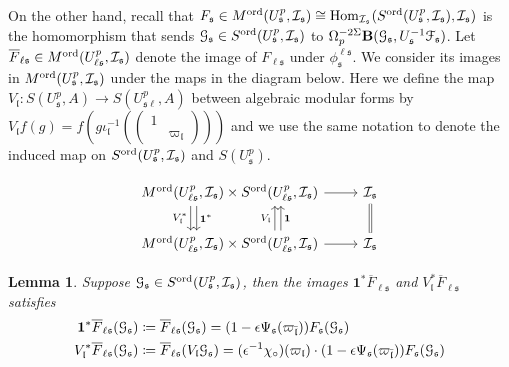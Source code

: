 \documentclass[leqno]{amsart}
\newtheorem{lem}[thm]{Lemma}
\theoremstyle{definition}
\theoremstyle{remark}
\newcommand{\smat}[1]{\left(\begin{smallmatrix} #1 \end{smallmatrix}\right)}
\newcommand{\id}{\mathbf{1}}
\DeclareMathOperator{\Hom}{Hom}
\newcommand{\fl}{\mathfrak{l}}
\newcommand{\fs}{\mathfrak{s}}
\newcommand{\euF}{\EuScript{F}} %
\newcommand{\I}{\mathcal{I}} %
\newcommand{\ord}{\textnormal{ord}} %
\begin{document}
On the other hand, recall that 
$F_{\fs}\in M^{\ord}(U^p_\fs,\I_\fs)\cong
\Hom_{\I_\fs}(S^{\ord}(U^p_\fs,\I_\fs),\I_\fs)$
is the homomorphism that sends
$\EuScript{G}_\fs\in S^{\ord}(U^p_\fs,\I_\fs)$
to $\Omega_p^{-2\Sigma}\mathbf{B}(\EuScript{G}_\fs, U_\fs^{-1}\euF_{\fs})$.
Let $\overline{F}_{\ell\fs}\in M^{\ord}(U^p_{\ell\fs},\I_\fs)$
denote the image of $F_{\ell\fs}$ under $\phi^{\ell\fs}_\fs$.
We consider its images in $M^{\ord}(U^p_\fs,\I_\fs)$
under the maps in the diagram below.
Here we define the map
$V_\fl\colon S(U^p_\fs,A)\to S(U^p_{\fs\ell},A)$
between algebraic modular forms by
$V_\fl f(g)=f(g\iota_\fl^{-1}(\smat{1&\\&\varpi_\fl}))$
and we use the same notation to denote the induced map on
$S^{\ord}(U^p_\fs,\I_\fs)$ and $S(U^p_\fs)$.


\[
\begin{tikzcd}
M^{\ord}(U^p_{\ell\fs},\I_\fs) 
\arrow[d, shift right=6.5ex, "V_\fl^*",swap]
\arrow[d, shift right=5.5ex, "\id^*"]
\times  S^{\ord}(U^p_{\ell\fs},\I_\fs) 
\arrow[r] &
\I_\fs \arrow[d,equal]\\
M^{\ord}(U^p_{\ell\fs},\I_\fs) \times
S^{\ord}(U^p_{\ell\fs},\I_\fs)
\arrow[u, shift right=7.5ex, "V_\fl"]
\arrow[u, shift right=8.5ex, "\id",swap]
\arrow[r] & \I_\fs
\end{tikzcd}
\]

\begin{lem}
Suppose $\EuScript{G}_{\fs}\in 
S^{\ord}(U^p_{\fs},\I_{\fs})$,
then the images 
$\id^*\overline{F}_{\ell\fs}$ and
$V_\fl^*\overline{F}_{\ell\fs}$ satisfies
\begin{align*}
\id^*\overline{F}_{\ell\fs}(\EuScript{G}_{\fs})&
\coloneqq \overline{F}_{\ell\fs}(\EuScript{G}_{\fs})=
(1-\epsilon\Psi_{\fs}(\varpi_{\bar{\fl}}))
F_{\fs}(\EuScript{G}_{\fs}) \\
V_\fl^*\overline{F}_{\ell\fs}(\EuScript{G}_{\fs})&
\coloneqq \overline{F}_{\ell\fs}(V_\fl\EuScript{G}_{\fs})=
(\epsilon^{-1}\chi_\circ)(\varpi_\fl)\cdot 
(1-\epsilon\Psi_{\fs}(\varpi_{\bar{\fl}}))
F_{\fs}(\EuScript{G}_{\fs})
\end{align*}
\end{lem}
\end{document}
